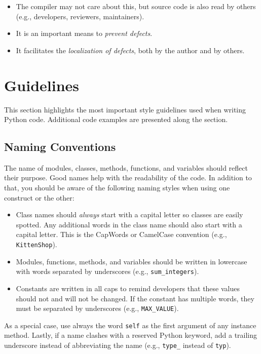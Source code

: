 \documentclass{tufte-handout}
\begin{document}
\begin{itemize}
	\item The compiler may not care about this,
	but source code is also read by others (e.g., developers, reviewers, maintainers).
	\item It is an important means to \emph{prevent defects}.
	\item It facilitates the \emph{localization of defects}, both by the author and by others.
\end{itemize}


\section{Guidelines}

This section highlights the most important style guidelines used when writing Python code.
Additional code examples are presented along the section.

\subsection{Naming Conventions}

The name of modules, classes, methods, functions, and variables should reflect their purpose.
Good names help with the readability of the code.
In addition to that, you should be aware of the following naming styles when using one construct or the other:

\begin{itemize}
	\item Class names should \emph{always} start with a capital letter so classes are easily spotted. Any additional words in the class name should also start with a capital letter. This is the CapWords or CamelCase convention (e.g., \texttt{KittenShop}).
	
	\item Modules, functions, methods, and variables should be written in lowercase with words separated by underscores (e.g., \texttt{sum\_integers}).
	
	\item Constants are written in all caps to remind developers that these values should not and will not be changed. If the constant has multiple words, they must be separated by underscores (e.g., \texttt{MAX\_VALUE}).
\end{itemize}

As a special case, use always the word \texttt{self} as the first argument of any instance method.
Lastly, if a name clashes with a reserved Python keyword, add a trailing underscore instead of abbreviating the name (e.g., \texttt{type\_} instead of \texttt{typ}).
\end{document}
